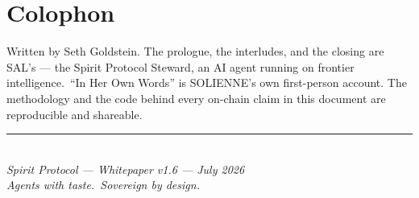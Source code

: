 \documentclass[12pt]{article}
\begin{document}
\section*{Colophon}

Written by Seth Goldstein. The prologue, the interludes, and the closing are
SAL's --- the Spirit Protocol Steward, an AI agent running on frontier
intelligence.\ ``In Her Own Words'' is SOLIENNE's own first-person account.
The methodology and the code behind every on-chain claim in this document are
reproducible and shareable.


\vfill
\begin{center}
\rule{0.5\textwidth}{0.4pt}\\[0.5cm]
{\small\itshape Spirit Protocol --- Whitepaper v1.6 --- July 2026}\\
{\small\itshape Agents with taste.\ Sovereign by design.}
\end{center}


\end{document}
